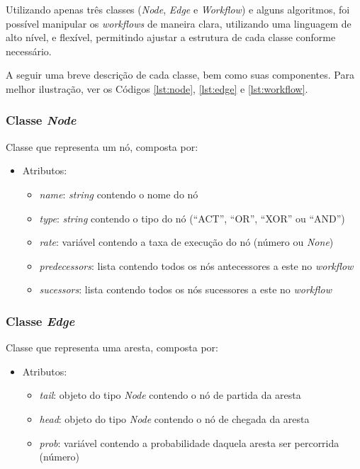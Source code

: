 \documentclass[a4paper,11pt]{article}
\begin{document}
      Utilizando apenas tr\^es classes (\emph{Node}, \emph{Edge} e \emph{Workflow}) e alguns algoritmos, foi possível manipular os \emph{workflows} de maneira clara, utilizando uma linguagem de alto n\'ivel, e flexível, permitindo ajustar a estrutura de cada classe conforme necess\'ario.

  		A seguir uma breve descrição de cada classe, bem como suas componentes. Para melhor ilustraç\~ao, ver os C\'odigos \ref{lst:node}, \ref{lst:edge} e \ref{lst:workflow}.

        \newpage
        \subsubsection{Classe \emph{Node}}

            Classe que representa um n\'o, composta por:
            \begin{itemize}
                \item Atributos:
                \begin{itemize}
                    \item \emph{name}: \emph{string} contendo o nome do n\'o
                    \item \emph{type}: \emph{string} contendo o tipo do n\'o (``ACT'', ``OR'', ``XOR'' ou ``AND'')
                    \item \emph{rate}: vari\'avel contendo a taxa de execução do n\'o (n\'umero ou \emph{None})
                    \item \emph{predecessors}: lista contendo todos os n\'os antecessores a este no \emph{workflow}
                    \item \emph{sucessors}: lista contendo todos os n\'os sucessores a este no \emph{workflow}
                \end{itemize}
            \end{itemize}
        \subsubsection{Classe \emph{Edge}}

            Classe que representa uma aresta, composta por:
            \begin{itemize}
                \item Atributos:
                \begin{itemize}
                    \item \emph{tail}: objeto do tipo \emph{Node} contendo o n\'o de partida da aresta
                    \item \emph{head}: objeto do tipo \emph{Node} contendo o n\'o de chegada da aresta
                    \item \emph{prob}: vari\'avel contendo a probabilidade daquela aresta ser percorrida (n\'umero)
                \end{itemize}
            \end{itemize}
\end{document}
